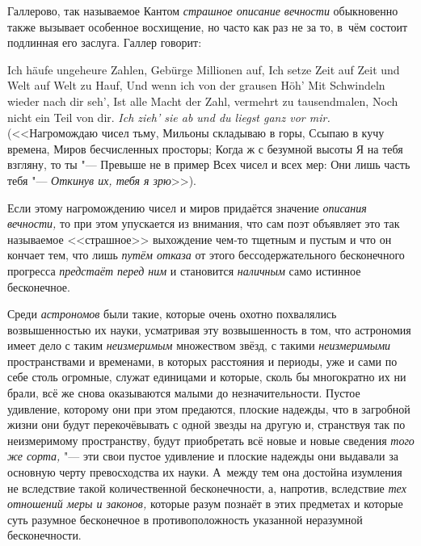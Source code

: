 Галлерово, так называемое Кантом {\em страшное описание вечности} обыкновенно
также вызывает особенное восхищение, но часто как раз не за то, в~чём состоит
подлинная его заслуга. Галлер говорит:

\begin{poem}{\footnotesize
Ich häufe ungeheure Zahlen, \verseline
Gebürge Millionen auf, \verseline
Ich setze Zeit auf Zeit und Welt auf Welt zu Hauf, \verseline
Und wenn ich von der grausen Höh' \verseline
Mit Schwindeln wieder nach dir seh', \verseline
Ist alle Macht der Zahl, vermehrt zu tausendmalen, \verseline
Noch nicht ein Teil von dir. \verseline
{\em Ich zieh' sie ab und du liegst ganz vor mir.} \verseline
\ \verseline}
(<<Нагромождаю чисел тьму, \verseline
Мильоны складываю в горы, \verseline
Ссыпаю в кучу времена, \verseline
Миров бесчисленных просторы; \verseline
Когда ж с безумной высоты \verseline
Я на тебя взгляну, то ты "--- \verseline
Превыше не в пример \verseline
Всех чисел и всех мер: \verseline
Они лишь часть тебя "--- \verseline
{\em Откинув их, тебя я зрю}>>).
\end{poem}

Если этому нагромождению чисел и миров придаётся значение
{\em описания вечности,} то при этом упускается из внимания, что сам поэт
объявляет это так называемое <<страшное>> выхождение чем-то тщетным и пустым и
что он кончает тем, что лишь {\em путём отказа} от этого бессодержательного
бесконечного прогресса {\em предстаёт перед ним} и становится {\em наличным}
само истинное бесконечное.

Среди {\em астрономов} были такие, которые очень охотно похвалялись
возвышенностью их науки, усматривая эту возвышенность в том, что астрономия
имеет дело с таким {\em неизмеримым} множеством звёзд, с такими
{\em неизмеримыми} пространствами и временами, в которых расстояния и периоды,
уже и сами по себе столь огромные, служат единицами и которые, сколь бы
многократно их ни брали, всё же снова оказываются малыми до незначительности.
Пустое удивление, которому они при этом предаются, плоские надежды, что в
загробной жизни они будут перекочёвывать с одной звезды на другую и, странствуя
так по неизмеримому пространству, будут приобретать всё новые и новые сведения
{\em того же сорта,} "--- эти свои пустое удивление и плоские надежды они
выдавали за основную черту превосходства их науки. А~между тем она достойна
изумления не вследствие такой количественной бесконечности, а, напротив,
вследствие {\em тех отношений меры и законов,} которые разум познаёт в этих
предметах и которые суть разумное бесконечное в противоположность указанной
неразумной бесконечности.

